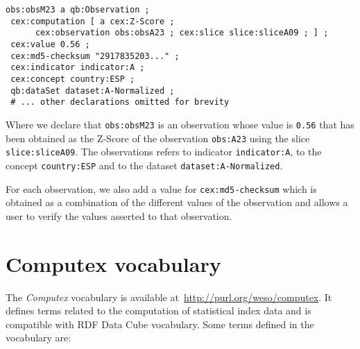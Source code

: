 \documentclass{acm_proc_article-sp}
\begin{document}
\begin{lstlisting}[style=SPARQL]
obs:obsM23 a qb:Observation ;
 cex:computation [ a cex:Z-Score ; 
      cex:observation obs:obsA23 ; cex:slice slice:sliceA09 ; ] ;
 cex:value 0.56 ;
 cex:md5-checksum "2917835203..." ;
 cex:indicator indicator:A ;
 cex:concept country:ESP ;
 qb:dataSet dataset:A-Normalized ;
 # ... other declarations omitted for brevity
\end{lstlisting}

Where we declare that \lstinline|obs:obsM23| is an observation
 whose value is \lstinline|0.56| that has been obtained as the Z-Score
 of the observation \lstinline|obs:A23| using the slice
 \lstinline|slice:sliceA09|. The observations refers to indicator
 \lstinline|indicator:A|, to the concept \lstinline|country:ESP| and to the
 dataset \lstinline|dataset:A-Normalized|.
 
For each observation, we also add a value for 
\lstinline|cex:md5-checksum| which is obtained as a combination of the 
different values of the observation and allows a user to verify the
values asserted to that observation.


\section{Computex vocabulary}

The \emph{Computex} vocabulary is available
at~\url{http://purl.org/weso/computex}. It defines terms related to the
computation of statistical index data and is compatible with RDF Data Cube
vocabulary. Some terms defined in the vocabulary are:
\end{document}
